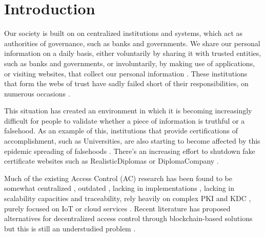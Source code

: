 \section{Introduction}
\label{chap:intro}

Our society is built on on centralized institutions and systems, which act as authorities of governance, such as banks and governments. We share our personal information on a daily basis, either voluntarily by sharing it with trusted entities, such as banks and governments, or involuntarily, by making use of applications, or visiting websites, that collect our personal information \cite{choi_embarrassing_2015}. These institutions that form the webs of trust have sadly failed short of their responsibilities, on numerous occasions \cite{gibbs_facebook_2014, marthews_government_2017}.

This situation has created an environment in which it is becoming increasingly difficult for people to validate whether a piece of information is truthful or a falsehood. As an example of this, institutions that provide certifications of accomplishment, such as Universities, are also starting to become affected by this epidemic spreading of falsehoods \cite{lam_how_2017}. There's an increasing effort to shutdown fake certificate websites \cite{camilla_telegraph} such as RealisticDiplomas \cite{RealisticDiplomas} or DiplomaCompany \cite{DiplomaCompany}.

Much of the existing Access Control (AC) research has been found to be somewhat centralized \cite{ruj_privacy_2012, calero_toward_2010, yu_achieving_2010}, outdated \cite{satyanarayanan_integrating_1989}, lacking in implementations \cite{thomas_towards_1993}, lacking in scalability capacities \cite{miltchev_decentralized_2008} and traceability, rely heavily on complex PKI and KDC \cite{ruj_privacy_2012, ruj_decentralized_2014}, purely focused on IoT \cite{ouaddah_fairaccess:_2017, ouaddah_access_2017} or cloud services \cite{ruj_decentralized_2014, ruj_dacc:_2011}. Recent literature has proposed alternatives for decentralized access control through blockchain-based solutions but this is still an understudied problem \cite{maesa_blockchain_2017, ouaddah_fairaccess:_2017}.

